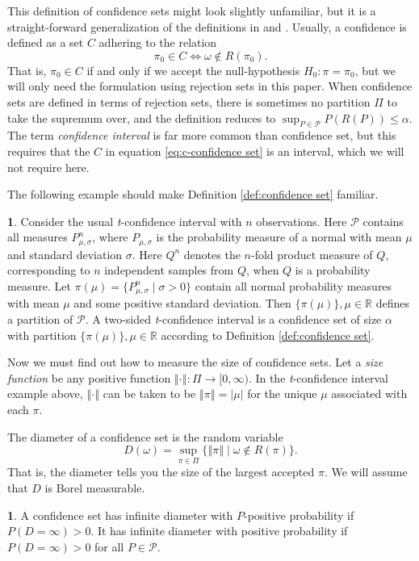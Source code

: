 \documentclass[article]{ajs}
\numberwithin{equation}{section}
\numberwithin{figure}{section}
\theoremstyle{plain}
\theoremstyle{definition}
\newtheorem{defn}[thm]{\protect\definitionname}
\theoremstyle{definition}
\newtheorem{example}[thm]{\protect\examplename}
\theoremstyle{plain}
\providecommand{\definitionname}{Definition}
\providecommand{\examplename}{Example}
\begin{document}
This definition of confidence sets might look slightly unfamiliar,
but it is a straight-forward generalization of the definitions in
\citet[Definition 9.1.5]{Casella2002-lg} and \citet[Section 3.5]{lehmann2006testing}.
Usually, a confidence is defined as a set $C$ adhering to the relation
\begin{equation}
\pi_{0}\in C\iff\omega\notin R(\pi_{0}).\label{eq:c-confidence set}
\end{equation}
That is, $\pi_{0}\in C$ if and only if we accept the null-hypothesis
$H_{0}:\pi=\pi_{0}$, but we will only need the formulation using rejection
sets in this paper. When confidence sets are defined in terms of rejection
sets, there is sometimes no partition $\Pi$ to take the supremum
over, and the definition reduces to $\sup_{P\in\mathcal{P}}P(R(P))\leq\alpha$.
The term\emph{ confidence interval} is far more common than confidence
set, but this requires that the $C$ in equation \ref{eq:c-confidence set}
is an interval, which we will not require here.

The following example should make Definition \ref{def:confidence set}
familiar.
\begin{example}
\label{exa:t-test} Consider the usual \emph{t}-confidence interval
with $n$ observations. Here $\mathcal{P}$ contains all measures
$P_{\mu,\sigma}^{n}$, where $P_{\mu,\sigma}$ is the probability
measure of a normal with mean $\mu$ and standard deviation $\sigma$.
Here $Q^{n}$ denotes the $n$-fold product measure of $Q$, corresponding to $n$ independent samples from $Q$, when $Q$ is a probability measure. Let $\pi(\mu)=\{P_{\mu,\sigma}^{n}\mid\sigma>0\}$
contain all normal probability measures with mean $\mu$ and some
positive standard deviation. Then $\{\pi(\mu)\},\mu\in\mathbb{R}$
defines a partition of $\mathcal{P}$. A two-sided \emph{t}-confidence
interval is a confidence set of size $\alpha$ with partition $\{\pi(\mu)\},\mu\in\mathbb{R}$
according to Definition \ref{def:confidence set}.
\end{example}

Now we must find out how to measure the size of confidence sets. Let
a \emph{size function} be any positive function $\left\Vert \cdot\right\Vert :\Pi\to[0,\infty)$.
In the \emph{t}-confidence interval example above, $\left\Vert \cdot\right\Vert $
can be taken to be $\left\Vert \pi\right\Vert =|\mu|$ for the unique
$\mu$ associated with each $\pi$. 

The diameter of a confidence set is the random variable
\begin{equation}
D(\omega)=\sup_{\pi\in\Pi}\{\left\Vert \pi\right\Vert \mid\omega\notin R(\pi)\}.\label{eq:diameter}
\end{equation}
That is, the diameter tells you the size of the largest accepted $\pi$.
We will assume that $D$ is Borel measurable.
\begin{defn}
\label{def:infinite diameter}A confidence set has infinite diameter
with $P$-positive probability if $P(D=\infty)>0$. It has infinite
diameter with positive probability if $P(D=\infty)>0$ for all $P\in\mathcal{P}$.
\end{defn}
\end{document}
